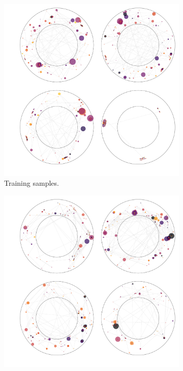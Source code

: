 \begin{figure}
    \centering
    \captionsetup[subfigure]{justification=centering}
    \begin{subfigure}[t]{0.48\textwidth}
        \centering
        \hspace{-1cm} %
        \includegraphics[width=\textwidth]{chapter4/grid_real_4.pdf}
        \caption{Training samples.}
    \end{subfigure}
    \quad
    \begin{subfigure}[t]{0.48\textwidth}
        \centering
        \hspace{-1cm} %
        \includegraphics[width=\textwidth]{chapter4/grid_fake_4.pdf}

\end{subfigure}
\end{figure}
